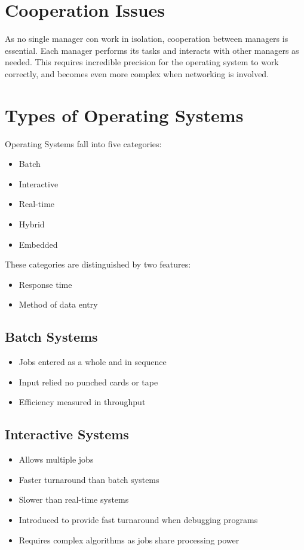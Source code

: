 \documentclass[12pt letter]{report}
\begin{document}
\section{Cooperation Issues}

As no single manager con work in isolation, cooperation between managers is essential. Each manager performs its tasks and interacts with other managers as needed.
This requires incredible precision for the operating system to work correctly, and becomes even more complex when networking is involved.

\section{Types of Operating Systems}

Operating Systems fall into five categories:
\begin{itemize}
  \item Batch
  \item Interactive
  \item Real-time
  \item Hybrid
  \item Embedded
\end{itemize}
These categories are distinguished by two features:
\begin{itemize}
  \item Response time
  \item Method of data entry
\end{itemize}

\subsection{Batch Systems}
\begin{itemize}
  \item Jobs entered as a whole and in sequence
  \item Input relied no punched cards or tape
  \item  Efficiency measured in throughput
\end{itemize}

\subsection{Interactive Systems}
\begin{itemize}
  \item Allows multiple jobs
  \item Faster turnaround than batch systems
  \item Slower than real-time systems
  \item Introduced to provide fast turnaround when debugging programs
  \item Requires complex algorithms as jobs share processing power
\end{itemize}
\end{document}
